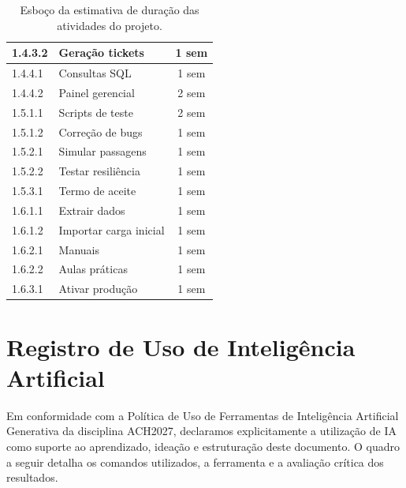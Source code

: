 \documentclass[a4paper]{article}
\begin{document}
\begin{table}[H]
\begin{tabular}{|l|p{8cm}|c|}
        \hline
        1.4.3.2 & Geração tickets & 1 sem \\
        \hline
        1.4.4.1 & Consultas SQL & 1 sem \\
        \hline
        1.4.4.2 & Painel gerencial & 2 sem \\
        \hline
        1.5.1.1 & Scripts de teste & 2 sem \\
        \hline
        1.5.1.2 & Correção de bugs & 1 sem \\
        \hline
        1.5.2.1 & Simular passagens & 1 sem \\
        \hline
        1.5.2.2 & Testar resiliência & 1 sem \\
        \hline
        1.5.3.1 & Termo de aceite & 1 sem \\
        \hline
        1.6.1.1 & Extrair dados & 1 sem \\
        \hline
        1.6.1.2 & Importar carga inicial & 1 sem \\
        \hline
        1.6.2.1 & Manuais & 1 sem \\
        \hline
        1.6.2.2 & Aulas práticas & 1 sem \\
        \hline
        1.6.3.1 & Ativar produção & 1 sem \\
        \hline
    \end{tabular}
    \caption{Esboço da estimativa de duração das atividades do projeto.}
    \label{tab:duracao_atividades}
\end{table}

\section{Registro de Uso de Inteligência Artificial}

Em conformidade com a Política de Uso de Ferramentas de Inteligência Artificial Generativa da disciplina ACH2027, declaramos explicitamente a utilização de IA como suporte ao aprendizado, ideação e estruturação deste documento. O quadro a seguir detalha os comandos utilizados, a ferramenta e a avaliação crítica dos resultados.
\end{document}
